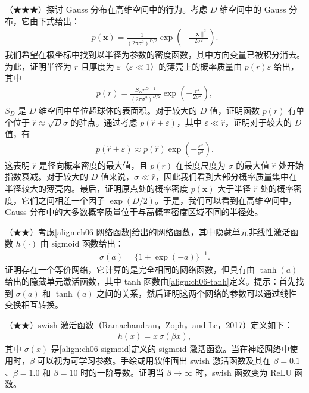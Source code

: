 \documentclass[../../main.tex]{subfiles}
\begin{document}
\begin{exercise}\label{exercise:ch06-03}
（★★★）探讨 Gauss 分布在高维空间中的行为。考虑 $D$ 维空间中的 Gauss 分布，它由下式给出：
\begin{align}
p(\boldsymbol{x})=\frac{1}{(2\pi\sigma^{2})^{D/2}}\exp\!\left(-\frac{\|\boldsymbol{x}\|^{2}}{2\sigma^{2}}\right).
\label{align:ch06-各向同性Gauss}
\end{align}
我们希望在极坐标中找到以半径为参数的密度函数，其中方向变量已被积分消去。为此，证明半径为 $r$ 且厚度为 $\varepsilon$（$\varepsilon\ll1$）的薄壳上的概率质量由 $p(r)\varepsilon$ 给出，其中
\begin{align}
p(r)=\frac{S_Dr^{D-1}}{(2\pi\sigma^{2})^{D/2}}\exp\!\left(-\frac{r^{2}}{2\sigma^{2}}\right),
\label{align:ch06-径向密度}
\end{align}
$S_D$ 是 $D$ 维空间中单位超球体的表面积。对于较大的 $D$ 值，证明函数 $p(r)$ 有单个位于 $\hat r\approx\sqrt{D}\sigma$ 的驻点。通过考虑 $p(\hat r+\varepsilon)$，其中 $\varepsilon\ll\hat r$，证明对于较大的 $D$ 值，有
\begin{align}
p(\hat r+\varepsilon)\approx p(\hat r)\exp\!\left(-\frac{\varepsilon^{2}}{\sigma^{2}}\right).
\label{align:ch06-径向展开}
\end{align}
这表明 $\hat r$ 是径向概率密度的最大值，且 $p(r)$ 在长度尺度为 $\sigma$ 的最大值 $\hat r$ 处开始指数衰减。对于较大的 $D$ 值来说，$\sigma\ll\hat r$，因此我们看到大部分概率质量集中在半径较大的薄壳内。最后，证明原点处的概率密度 $p(\boldsymbol{x})$ 大于半径 $\hat r$ 处的概率密度，它们之间相差一个因子 $\exp(D/2)$。于是，我们可以看到在高维空间中，Gauss 分布中的大多数概率质量位于与高概率密度区域不同的半径处。
\end{exercise}

\begin{exercise}\label{exercise:ch06-04}
（★★）考虑\eqref{align:ch06-网络函数}给出的网络函数，其中隐藏单元非线性激活函数 $h(\cdot)$ 由 sigmoid 函数给出：
\begin{align}
\sigma(a)=\bigl\{1+\exp(-a)\bigr\}^{-1}.
\label{align:ch06-sigmoid重述}
\end{align}
证明存在一个等价网络，它计算的是完全相同的网络函数，但具有由 $\tanh(a)$ 给出的隐藏单元激活函数，其中 tanh 函数由\eqref{align:ch06-tanh}定义。提示：首先找到 $\sigma(a)$ 和 $\tanh(a)$ 之间的关系，然后证明这两个网络的参数可以通过线性变换相互转换。
\end{exercise}

\begin{exercise}\label{exercise:ch06-05}
（★★）swish 激活函数（Ramachandran，Zoph，and Le，2017）定义如下：
\begin{align}
h(x)=x\,\sigma(\beta x),
\label{align:ch06-swish}
\end{align}
其中 $\sigma(x)$ 是\eqref{align:ch06-sigmoid}定义的 sigmoid 激活函数。当在神经网络中使用时，$\beta$ 可以视为可学习参数。手绘或用软件画出 swish 激活函数及其在 $\beta=0.1$、$\beta=1.0$ 和 $\beta=10$ 时的一阶导数。证明当 $\beta\to\infty$ 时，swish 函数变为 ReLU 函数。
\end{exercise}
\end{document}
